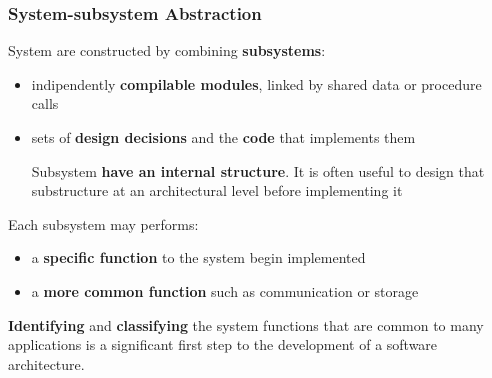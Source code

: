 \subsubsection{System-subsystem Abstraction}

System are constructed by combining \textbf{subsystems}:
\begin{itemize}
	\item indipendently \textbf{compilable modules}, linked by shared data or procedure calls
	\item sets of \textbf{design decisions} and the \textbf{code} that implements them
	
Subsystem \textbf{have an internal structure}. It is often useful to design that substructure at an architectural level before implementing it
\end{itemize}

Each subsystem may performs:
\begin{itemize}
	\item a \textbf{specific function} to the system begin implemented
	\item a \textbf{more common function} such as communication or storage
\end{itemize}

\textbf{Identifying} and \textbf{classifying} the system functions that are common to many applications is a significant first step to the development of a software architecture.